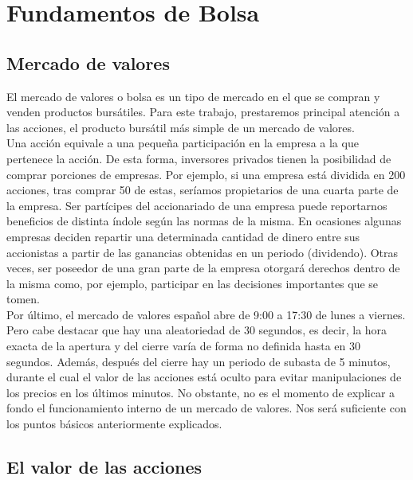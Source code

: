 \section{Fundamentos de Bolsa}
	
		\subsection{Mercado de valores}
		
		El mercado de valores o bolsa es un tipo de mercado en el que se compran y venden productos burs\'atiles. Para este trabajo, prestaremos principal atenci\'on a las acciones, el producto burs\'atil m\'as simple de un mercado de valores.\\
		
		Una acci\'on equivale a una pequeña participaci\'on en la empresa a la que pertenece la acci\'on. De esta forma, inversores privados tienen la posibilidad de comprar porciones de empresas. Por ejemplo, si una empresa est\'a dividida en 200 acciones, tras comprar 50 de estas, ser\'iamos propietarios de una cuarta parte de la empresa. Ser part\'icipes del accionariado de una empresa puede reportarnos beneficios de distinta \'indole seg\'un las normas de la misma. En ocasiones algunas empresas deciden repartir una determinada cantidad de dinero entre sus accionistas a partir de las ganancias obtenidas en un periodo (dividendo). Otras veces, ser poseedor de una gran parte de la empresa otorgar\'a derechos dentro de la misma como, por ejemplo, participar en las decisiones importantes que se tomen.\\
		
		Por \'ultimo, el mercado de valores espa\~nol abre de 9:00 a 17:30 de lunes a viernes. Pero cabe destacar que hay una aleatoriedad de 30 segundos, es decir, la hora exacta de la apertura y del cierre var\'ia de forma no definida hasta en 30 segundos. Además, despu\'es del cierre hay un periodo de subasta de 5 minutos, durante el cual el valor de las acciones est\'a oculto para evitar manipulaciones de los precios en los \'ultimos minutos. No obstante, no es el momento de explicar a fondo el funcionamiento interno de un mercado de valores. Nos ser\'a suficiente con los puntos b\'asicos anteriormente explicados.\\
		
		\subsection{El valor de las acciones}
		
